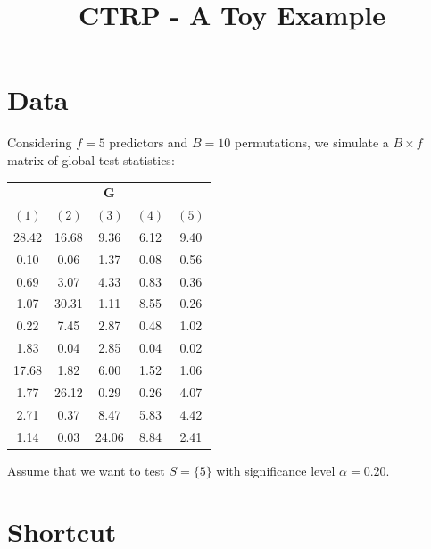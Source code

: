 \documentclass[11pt,a4paper,openright,twoside]{article}
\title{CTRP - A Toy Example}
\author{}
\date{}
\begin{document}
\maketitle

\section{Data}
Considering $f=5$ predictors and $B=10$ permutations, we simulate a $B\times f$ matrix of global test statistics:

\begin{table}[h!]
\centering
\begin{tabular}{ccccc}
\multicolumn{5}{c}{$\mathbf{G}$}\\
$(1)$ & $(2)$ & $(3)$ & $(4)$ & $(5)$\\
\cline{1-5}
28.42 & 16.68 & 9.36 & 6.12 & 9.40\\
0.10 & 0.06 & 1.37 & 0.08 & 0.56\\
0.69 & 3.07 & 4.33 & 0.83 & 0.36\\
1.07 & 30.31 & 1.11 & 8.55 & 0.26\\
0.22 & 7.45 & 2.87 & 0.48 & 1.02\\
1.83 & 0.04 & 2.85 & 0.04 & 0.02\\
17.68 & 1.82 & 6.00 & 1.52 & 1.06\\
1.77 & 26.12 & 0.29 & 0.26 & 4.07\\
2.71 & 0.37 & 8.47 & 5.83 & 4.42\\
1.14 & 0.03 & 24.06 & 8.84 & 2.41\\
\end{tabular}
\end{table}

Assume that we want to test $S=\{5\}$ with significance level $\alpha=0.20$.




\vspace{10mm}
\section{Shortcut}
\begin{table}[h!]
\centering
{}
\caption{Supersets of $S=\{5\}$, having sizes $|V|=1+v$ with $v=0,\ldots,4$. The sets in bold are used to define the lower critical value $L_v$.}
\end{table}
\end{document}
